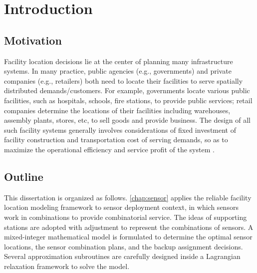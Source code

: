 
\chapter{Introduction}\label{chap:introduction}



\section{Motivation}\label{sec:intro-motivation}

Facility location decisions lie at the center of planning many infrastructure systems. In many practice, public agencies (e.g., governments) and private companies (e.g., retailers) both need to locate their facilities to serve spatially distributed demands/customers. For example, governments locate various public facilities, such as hospitals, schools, fire stations, to provide public services; retail companies determine the locations of their facilities including warehouses, assembly plants, stores, etc, to sell goods and provide business. The design of all such facility systems generally involves considerations of fixed investment of facility construction and transportation cost of serving demands, so as to maximize the operational efficiency and service profit of the system \citep{Daskin-2005}.


\section{Outline}\label{sec:intro-outline}

This dissertation is organized as follows. \autoref{chap:sensor} applies the reliable facility location modeling framework to sensor deployment context, in which sensors work in combinations to provide combinatorial service. The ideas of supporting stations are adopted with adjustment to represent the combinations of sensors. A mixed-integer mathematical model is formulated to determine the optimal sensor locations, the sensor combination plans, and the backup assignment decisions. Several approximation subroutines are carefully designed inside a Lagrangian relaxation framework to solve the model.  

